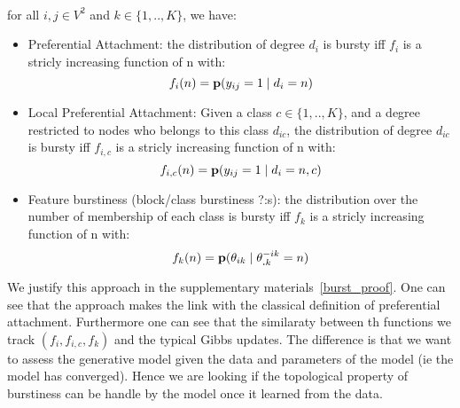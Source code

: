 \begin{proposition}~\\
for all $i,j \in V^2$ and $k \in \{1,.., K\}$, we have:
\begin{itemize}
	\item Preferential Attachment: the distribution of degree $d_i$ is bursty iff $f_i$ is a stricly increasing function of n with: $$f_i(n)=\mathbf{p}(y_{ij}=1 \mid d_i=n)$$
	\item Local Preferential Attachment: Given a class $c \in \{1,..,K\}$, and a degree restricted to nodes who belongs to this class $d_{ic}$, the distribution of degree $d_{ic}$ is bursty iff $f_{i,c}$ is a stricly increasing function of n with: $$f_{i,c}(n)=\mathbf{p}(y_{ij}=1 \mid d_i=n, c)$$
	\item Feature burstiness (block/class burstiness ?:s): the distribution over the number of membership of each class is bursty iff  $f_k$  is a stricly increasing function of n with: $$f_k(n) = \mathbf{p}(\theta_{ik} \mid \theta_{\bm{.}k}^{-ik}=n)$$ 
\end{itemize}
\end{proposition}

We justify this approach in the supplementary materials~\ref{burst_proof}. One can see that the approach makes the link with the classical definition of preferential attachment. Furthermore one can see that the similaraty between th functions we track $(f_i, f_{i,c}, f_k)$ and the typical Gibbs updates. The difference is that we want to assess the generative model given the data and parameters of the model (ie the model has converged). Hence we are looking if the topological property of burstiness can be handle by the model once it learned from the data.~\\



